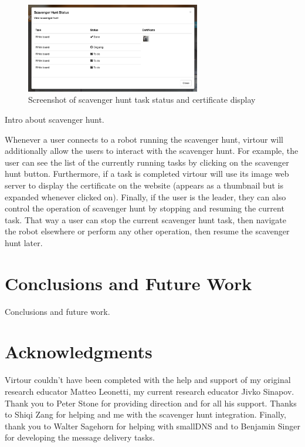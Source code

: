 \documentclass{sig-alternate-05-2015}
\begin{document}
\begin{figure}
\centering
\includegraphics[width=3in]{scav_certs}
\caption{Screenshot of scavenger hunt task status and certificate display}
\end{figure}

Intro about scavenger hunt.

Whenever a user connects to a robot running the scavenger hunt, virtour will
additionally allow the users to interact with the scavenger hunt. For example,
the user can see the list of the currently running tasks by clicking on the
scavenger hunt button. Furthermore, if a task is completed virtour will use
its image web server to display the certificate on the website (appears as a
thumbnail but is expanded whenever clicked on). Finally, if the user is the
leader, they can also control the operation of scavenger hunt by stopping and
resuming the current task. That way a user can stop the current scavenger hunt
task, then navigate the robot elsewhere or perform any other operation, then
resume the scavenger hunt later.

\section{Conclusions and Future Work}

Conclusions and future work.

\section{Acknowledgments}

Virtour couldn't have been completed with the help and support of my original
research educator Matteo Leonetti, my current research educator Jivko Sinapov.
Thank you to Peter Stone for providing direction and for all his support.
Thanks to Shiqi Zang for helping and me with the scavenger hunt integration.
Finally, thank you to Walter Sagehorn for helping with smallDNS and to Benjamin
Singer for developing the message delivery tasks.


\end{document}
